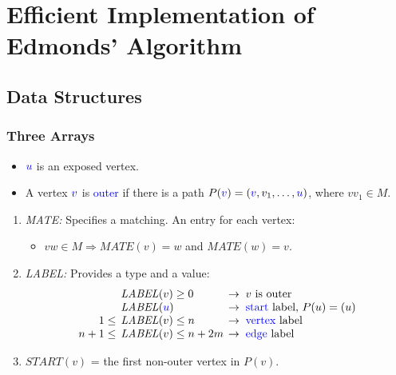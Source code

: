 \documentclass[pdftex]{beamer}
\newcommand{\subbullet}{\color{mypurple}\scriptsize\ding{235}}
\newcommand{\blue}[1]{\textcolor{blue}{#1}}
\begin{document}

\section[Efficient Implementation]{Efficient Implementation of Edmonds'
  Algorithm}

\subsection{Data Structures}

\begin{frame} \frametitle{Three Arrays}
  \vspace{-2ex}
  \begin{itemize}
  \item $\blue{u}$ is an exposed vertex.
  \item A vertex $\blue{v}$ is \blue{outer} if there is a path $P(\blue{v}) = (\blue{v},
    v_1, \ldots, \blue{u})$, where $vv_1 \in M$.
  \end{itemize}
  \begin{enumerate}
  \item \emph{\textrm{MATE:}} Specifies a matching. An entry for each vertex:
    \begin{itemize}
    \item[\subbullet] $vw \in M \Rightarrow \mathit{MATE}(v) = w$ and $\mathit{MATE}(w) = v$.
    \end{itemize}
  \item \emph{\textrm{LABEL:}} Provides a type and a value:%
    \vspace{-2ex}
    \[%
    \renewcommand{\arraycolsep}{.5ex}
    \begin{array}{rll}
      & \mathit{LABEL}(v) \ge 0 & \rightarrow \; v \text{ is outer} \\
      & \mathit{LABEL}(\blue{u}) & \rightarrow \; \text{\blue{start} label, } P(u)
      = (u)\\
      1 \le & \mathit{LABEL}(v) \le n & \rightarrow \;
      \text{\blue{vertex} label}\\
      n+1 \le & \mathit{LABEL}(v) \le n+2m
      & \rightarrow \; \text{\blue{edge} label}
    \end{array}
    \]
  \item $\mathit{START}(v)$ = the first non-outer vertex
      in $P(v)$.
  \end{enumerate}
\end{frame}
\end{document}
